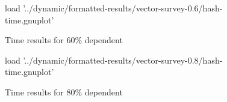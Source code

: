 \begin{figure}[H]
	\centering
	\begin{gnuplot}[terminal=pdf]
	load '../dynamic/formatted-results/vector-survey-0.6/hash-time.gnuplot'
	\end{gnuplot}
	\caption{Time results for 60\% dependent}
	\label{chart:time-0.6-hash}
\end{figure}

\begin{figure}[H]
	\centering
	\begin{gnuplot}[terminal=pdf]
	load '../dynamic/formatted-results/vector-survey-0.8/hash-time.gnuplot'
	\end{gnuplot}
	\caption{Time results for 80\% dependent}
	\label{chart:time-0.8-hash}
\end{figure}